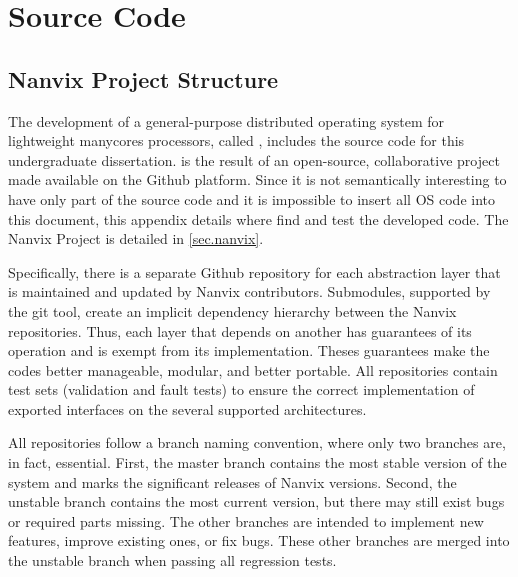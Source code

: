 \chapter{Source Code}
\label{ch:source-code}




\renewcommand{\thefigure}{B-\arabic{figure}}
\setcounter{figure}{0}

\renewcommand{\thelisting}{B-\arabic{listing}}
\setcounter{listing}{0}

\section{Nanvix Project Structure}

	The development of a general-purpose distributed operating system for
	lightweight manycores processors, called \nanvixos, includes the source
	code for this undergraduate dissertation. \nanvixos is the result of an
	open-source, collaborative project made available on the Github platform.
	Since it is not semantically interesting to have only part of the source
	code and it is impossible to insert all OS code into this document, this
	appendix details where find and test the developed code. The Nanvix
	Project is detailed in \autoref{sec.nanvix}.

	Specifically, there is a separate Github repository for each abstraction
	layer that is maintained and updated by Nanvix contributors. Submodules,
	supported by the git tool, create an implicit dependency hierarchy
	between the Nanvix repositories. Thus, each layer that depends on another
	has guarantees of its operation and is exempt from its implementation.
	Theses guarantees make the codes better manageable, modular, and better
	portable. All repositories contain test sets (validation and fault tests)
	to ensure the correct implementation of exported interfaces on the several
	supported architectures.

	All repositories follow a branch naming convention, where only two
	branches are, in fact, essential. First, the master branch contains
	the most stable version of the system and marks the significant
	releases of Nanvix versions. Second, the unstable branch contains
	the most current version, but there may still exist bugs or required
	parts missing. The other branches are intended to implement new features,
	improve existing ones, or fix bugs. These other branches are merged
	into the unstable branch when passing all regression tests.

